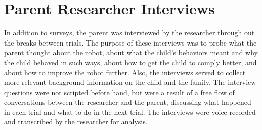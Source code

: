 \section{Parent Researcher Interviews}
In addition to surveys, the parent was interviewed by the researcher through out the breaks between trials.  The purpose of these interviews was to probe what the parent thought about the robot, about what the child's behaviors meant and why the child behaved in such ways, about how to get the child to comply better, and about how to improve the robot further.  Also, the interviews served to collect more relevant background information on the child and the family.  The interview questions were not scripted before hand, but were a result of a free flow of conversations between the researcher and the parent, discussing what happened in each trial and what to do in the next trial.  The interviews were voice recorded and transcribed by the researcher for analysis.

